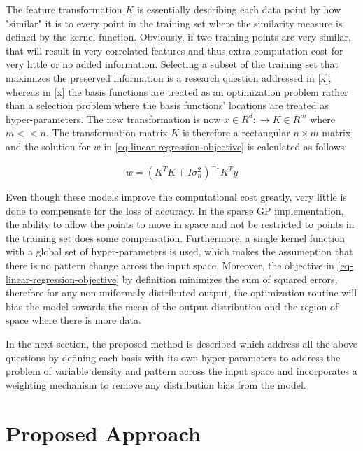\documentclass[a4paper,12pt]{article}
\begin{document}
The feature transformation $K$ is essentially describing each data point by how "similar" it is to every point in the training set where the similarity measure is defined by the kernel function. Obviously, if two training points are very similar, that will result in very correlated features and thus extra computation cost for very little or no added information. Selecting a subset of the training set that maximizes the preserved information is a research question addressed in [x], whereas in [x] the basis functions are treated as an optimization problem rather than a selection problem where the basis functions' locations are treated as hyper-parameters. The new transformation is now $x\in R^{d}:\rightarrow K\in R^{m}$ where $m<<n$. The transformation matrix $K$ is therefore a rectangular $n\times m$ matrix and the solution for $w$ in \eqref{eq-linear-regression-objective} is calculated as follows:

\begin{equation}
\label{eq-linear-regression-objective-rectangular}
w = \left(K^{T}K+I\sigma_{n}^{2} \right)^{-1}K^{T}y
\end{equation}

Even though these models improve the computational cost greatly, very little is done to compensate for the loss of accuracy. In the sparse GP implementation, the ability to allow the points to move in space and not be restricted to points in the training set does some compensation. Furthermore, a single kernel function with a global set of hyper-parameters is used, which makes the assumeption that there is no pattern change across the input space. Moreover, the objective in \eqref{eq-linear-regression-objective} by definition minimizes the sum of squared errors, therefore for any non-uniformaly distributed output, the optimization routine will bias the model towards the mean of the output distribution and the region of space where there is more data.

In the next section, the proposed method is described which address all the above questions by defining each basis with its own hyper-parameters to address the problem of variable density and pattern across the input space and incorporates a weighting mechanism to remove any distribution bias from the model. 

\section{Proposed Approach}
\label{sec-proposed-approach}
\end{document}
